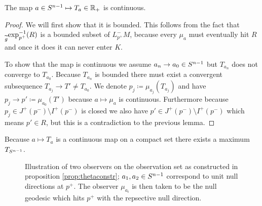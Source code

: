 \begin{lemma}
    The map $a\in {S^{n-1}}\mapsto T_a\in \mathbb{R}_+$ is continuous.
\end{lemma}
\begin{proof}
    We will first show that it is bounded. This follows from the fact that $\prescript{}{\widetilde{g}}{\exp_{p^+}^{-1}}(R)$ is a bounded subset of $L^-_{p^+}M$, because every $\mu_a$ must eventually hit $R$ and once it does it can never enter $K$.

    To show that the map is continuous we assume $a_n \to a_0 \in {S^{n-1}}$ but $T_{a_n}$ does not converge to $T_{a_0}$. Because $T_{a_n}$ is bounded there must exist a convergent subsequence $T_{a_j}\to T'\neq T_{a_0}$. We denote $p_j\coloneqq \mu_{a_j}(T_{a_j})$ and have $p_j\to p'\coloneqq \mu_{a_0}(T')$ because $a\mapsto \mu_a$ is continuous. Furthermore because $p_j\in J^+(p^-)\setminus I^+(p^-)$ is closed we also have $p'\in J^+(p^-)\setminus I^+(p^-)$ which means $p'\in R$, but this is a contradiction to the previous lemma.
\end{proof}
Because $a\mapsto T_a$ is a continuous map on a compact set there exists a maximum $T_{S^{n-1}}$.

\begin{figure}\label{fig:Observers}
    \centering
    
    \caption{Illustration of two observers on the observation set as constructed in proposition \ref{prop:thetaconstr}; $a_1,a_2\in {S^{n-1}}$ correspond to unit null directions at $p^+$. The observer $\mu_{a_i}$ is then taken to be the null geodesic which hits $p^+$ with the repsective null direction.}
\end{figure}

